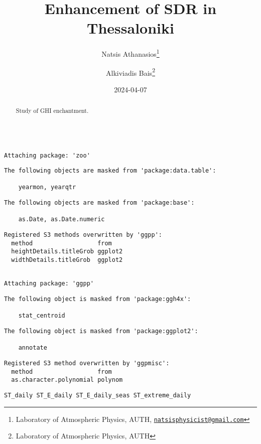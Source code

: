 \documentclass[
  10pt,
  a4paper,oneside]{article}
\title{Enhancement of SDR in Thessaloniki}
\author{Natsis Athanasios\footnote{Laboratory of Atmospheric Physics, AUTH, \href{mailto:natsisphysicist@gmail.com}{\nolinkurl{natsisphysicist@gmail.com}}} \and Alkiviadis Bais\footnote{Laboratory of Atmospheric Physics, AUTH}}
\date{2024-04-07}
\begin{document}
\maketitle
\begin{abstract}
Study of GHI enchantment.
\end{abstract}

{
\hypersetup{linkcolor=}
\setcounter{tocdepth}{4}
\tableofcontents
}
\begin{verbatim}

Attaching package: 'zoo'
\end{verbatim}

\begin{verbatim}
The following objects are masked from 'package:data.table':

    yearmon, yearqtr
\end{verbatim}

\begin{verbatim}
The following objects are masked from 'package:base':

    as.Date, as.Date.numeric
\end{verbatim}

\begin{verbatim}
Registered S3 methods overwritten by 'ggpp':
  method                  from   
  heightDetails.titleGrob ggplot2
  widthDetails.titleGrob  ggplot2
\end{verbatim}

\begin{verbatim}

Attaching package: 'ggpp'
\end{verbatim}

\begin{verbatim}
The following object is masked from 'package:ggh4x':

    stat_centroid
\end{verbatim}

\begin{verbatim}
The following object is masked from 'package:ggplot2':

    annotate
\end{verbatim}

\begin{verbatim}
Registered S3 method overwritten by 'ggpmisc':
  method                  from   
  as.character.polynomial polynom
\end{verbatim}

\begin{verbatim}
ST_daily ST_E_daily ST_E_daily_seas ST_extreme_daily
\end{verbatim}
\end{document}
